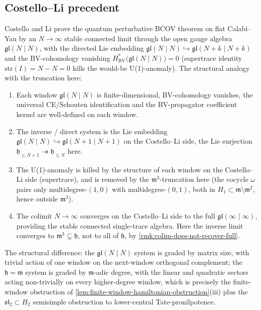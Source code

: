 \subsection*{Costello--Li precedent}

\begin{rmk}\label{rmk:costello-li-precedent}
Costello and Li \cite{costello-li-quantum-bcov} prove the
quantum perturbative BCOV theorem on flat Calabi--Yau by an
$N\to\infty$ stable connected limit through the open gauge algebra
$\mathfrak{gl}(N\mid N)$, with the directed Lie embedding
$\mathfrak{gl}(N\mid N)\hookrightarrow\mathfrak{gl}(N+k\mid N+k)$
and the BV-cohomology vanishing
$H^*_{\mathrm{BV}}\bigl(\mathfrak{gl}(N\mid N)\bigr)=0$
(supertrace identity $\mathrm{str}(I)=N-N=0$ kills the would-be
U(1)-anomaly). The structural analogy with the truncation here:
\begin{enumerate}
  \item Each window $\mathfrak{gl}(N\mid N)$ is finite-dimensional,
    BV-cohomology vanishes, the universal CE/Schouten identification
    and the BV-propagator coefficient kernel are well-defined on
    each window.
  \item The inverse / direct system is the Lie embedding
    $\mathfrak{gl}(N\mid N)\hookrightarrow\mathfrak{gl}(N+1\mid N+1)$
    on the Costello--Li side, the Lie surjection
    $\mathfrak h_{\leq N+1}\twoheadrightarrow\mathfrak h_{\leq N}$
    here.
  \item The U(1)-anomaly is killed by the structure of each window
    on the Costello--Li side (supertrace), and is removed by the
    $\mathfrak m^3$-truncation here (the cocycle $\omega$
    pairs only multidegree-$(1,0)$ with multidegree-$(0,1)$, both
    in $H_1\subset\mathfrak m\setminus\mathfrak m^2$, hence outside
    $\mathfrak m^3$).
  \item The colimit $N\to\infty$ converges on the Costello--Li side
    to the full $\mathfrak{gl}(\infty\mid\infty)$, providing the
    stable connected single-trace algebra. Here the inverse limit
    converges to $\mathfrak m^3\subsetneq\mathfrak h$, not to all
    of $\mathfrak h$, by \ref{rmk:colim-does-not-recover-full}.
\end{enumerate}
The structural difference: the
$\mathfrak{gl}(N\mid N)$ system is graded by matrix size, with
trivial action of one window on the next-window orthogonal
complement; the
$\mathfrak h=\mathfrak m$ system is graded by $\mathfrak m$-adic
degree, with the linear and quadratic sectors acting non-trivially
on every higher-degree window, which is precisely the
finite-window obstruction of
\ref{lem:finite-window-hamiltonian-obstruction}(iii) plus the
$\mathfrak{sl}_2\subset H_2$ semisimple obstruction to
lower-central Tate-pronilpotence.
\end{rmk}

